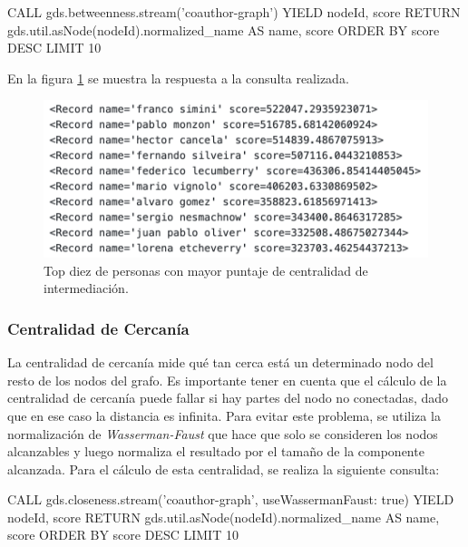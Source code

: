 \documentclass[journal]{IEEEtran}
\begin{document}
\begin{sflisting}[style=sparql,caption= Centralidad de Intermediación,label=codigo2]
	CALL gds.betweenness.stream('coauthor-graph')
	YIELD nodeId, score
	RETURN gds.util.asNode(nodeId).normalized_name
	AS name, score
	ORDER BY score DESC
	LIMIT 10
\end{sflisting}

En la figura \ref{fig:intermediacion} se muestra la respuesta a la consulta realizada.

\begin{figure}[t]
	\centering
	\includegraphics[width=\linewidth]{imagenes/intermediacion.png}
	\caption{Top diez de personas con mayor puntaje de centralidad de intermediación.}
	\label{fig:intermediacion}
\end{figure}

\subsubsection{Centralidad de Cercanía}
La centralidad de cercanía mide qué tan cerca está un determinado nodo del resto de los nodos del grafo. Es importante tener en cuenta que el cálculo de la centralidad de cercanía puede fallar si hay partes del nodo no conectadas, dado que en ese caso la distancia es infinita. Para evitar este problema, se utiliza la normalización de \textit{Wasserman-Faust} que hace que solo se consideren los nodos alcanzables y luego normaliza el resultado por el tamaño de la componente alcanzada. Para el cálculo de esta centralidad, se realiza la siguiente consulta:

\begin{sflisting}[style=sparql,caption= Centralidad de Cercanía,label=codigo2]
	CALL gds.closeness.stream('coauthor-graph',
	{useWassermanFaust: true})
	YIELD nodeId, score
	RETURN gds.util.asNode(nodeId).normalized_name
	AS name, score
	ORDER BY score DESC
	LIMIT 10
\end{sflisting}
\end{document}
